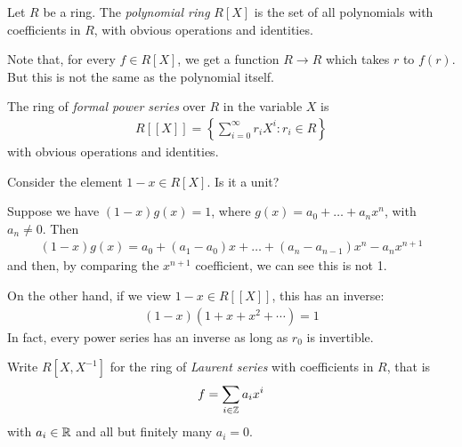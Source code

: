 \documentclass{../../template/note}
\begin{document}
    \begin{definition}
        Let $R$ be a ring. The \emph{polynomial ring} $R[X]$ is the set of all polynomials with coefficients in $R$, with obvious operations and identities.
    \end{definition}
    
    \begin{remark*}
        Note that, for every $f \in R[X]$, we get a function $R \to R$ which takes $r$ to $f(r)$. But this is not the same as the polynomial itself.
    \end{remark*}
    
    \begin{definition}
        The ring of \emph{formal power series} over $R$ in the variable $X$ is
        \begin{align*}
            R[[X]] = \left\{\sum_{i=0}^\infty r_iX^i : r_i \in R\right\}
        \end{align*}
        with obvious operations and identities.
    \end{definition}
    
    \begin{example}
        Consider the element $1-x \in R[X]$. Is it a unit?

        Suppose we have $(1-x)g(x) = 1$, where $g(x) = a_0 + \dots + a_nx^n$, with $a_n \neq 0$. Then
        \begin{align*}
            (1-x)g(x) = a_0 + (a_1-a_0)x + \dots + (a_n-a_{n-1})x^n - a_nx^{n+1}
        \end{align*}
        and then, by comparing the $x^{n+1}$ coefficient, we can see this is not 1.
        
        On the other hand, if we view $1-x \in R[[X]]$, this has an inverse:
        \begin{align*}
            (1-x)(1+x+x^2+\cdots)=1
        \end{align*}
        In fact, every power series has an inverse as long as $r_0$ is invertible.        
    \end{example}
    
    \begin{definition}
        Write $R[X, X^{-1}]$ for the ring of \emph{Laurent series} with coefficients in $R$, that is
        \begin{align*}
            f = \sum_{i \in \mathbb Z} a_ix^i
        \end{align*}
        with $a_i \in \mathbb R$ and all but finitely many $a_i = 0$.        
    \end{definition}
    
\end{document}
